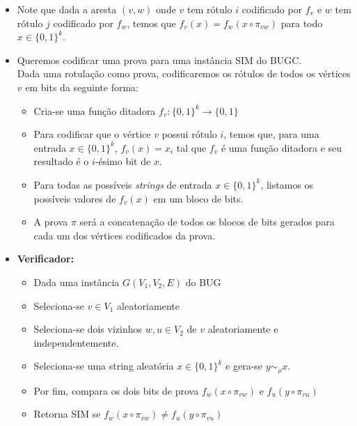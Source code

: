 \documentclass[12pt,a4paper]{article}
\begin{document}
\begin{itemize}
    \item Note que dada a aresta $(v,w)$ onde $v$ tem rótulo $i$ codificado por $f_v$ e $w$ tem rótulo $j$ codificado por $f_w$, temos que $f_v(x)=f_w(x\circ \pi_{vw})$ para todo $x\in \{0,1\}^k$.
    \item Queremos codificar uma prova para uma instância SIM do BUGC.\\
    Dada uma rotulação como prova, codificaremos os rótulos de todos os vértices $v$ em bits da seguinte forma:
    \begin{itemize}
        \item Cria-se uma função ditadora $f_v:\{0,1\}^k \xrightarrow\ \{0,1\}$
        \item Para codificar que o vértice $v$ possui rótulo $i$, temos que, para uma entrada $x\in \{0,1\}^k$, $f_v(x)=x_i$ tal que $f_v$ é uma função ditadora e seu resultado é o $i$-ésimo bit de $x$.
        \item Para todas as possíveis \textit{strings} de entrada $x\in \{0,1\}^k$, listamos os possíveis valores de $f_v(x)$ em um bloco de bits.
        \item A prova $\pi$ será a concatenação de todos os blocos de bits gerados para cada um dos vértices codificados da prova.
    \end{itemize}
    
    \item \textbf{Verificador:}
        \begin{itemize}
            \item Dada uma instância $G(V_1,V_2,E)$ do BUG
            \item Seleciona-se $v\in V_1$ aleatoriamente
            \item Seleciona-se dois vizinhos $w,u\in V_2$ de $v$ aleatoriamente e independentemente. \item Seleciona-se uma string aleatória $x\in \{0,1\}^k$ e gera-se $y\sim_\rho x$. 
            \item Por fim, compara os dois bits de prova $f_w(x\circ \pi_{vw})$ e $f_u(y\circ \pi_{vu})$
            \item Retorna SIM se $f_w(x\circ \pi_{vw})\ne f_u(y\circ \pi_{vu})$
        \end{itemize}
    

\end{itemize}
\end{document}
